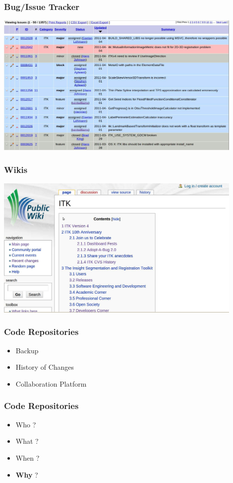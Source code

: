 \documentclass[18pt]{beamer}
\begin{document}
{
\begin{frame}
\frametitle{Bug/Issue Tracker}
\includegraphics[width=0.9\textwidth,height=0.9\paperheight]{../Art/ITKMANTISScreenShot.jpg}
\end{frame}
}


{
\begin{frame}
\frametitle{Wikis}
\includegraphics[width=0.9\textwidth,height=0.9\paperheight]{../Art/ITKWikiScreenShot.jpg}
\end{frame}
}




\begin{frame}
\frametitle{Code Repositories}
\Huge
\begin{itemize}
\item Backup
\pause
\item History of Changes
\pause
\item Collaboration Platform
\end{itemize}
\end{frame}


\begin{frame}
\frametitle{Code Repositories}
\Huge
\begin{itemize}
\item Who ?
\pause
\item What ?
\pause
\item When ?
\pause
\item \textbf{Why} ?
\end{itemize}
\end{frame}
\end{document}
